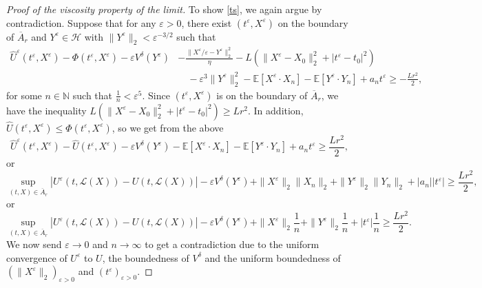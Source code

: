 \documentclass[reqno,11pt]{amsart}
\numberwithin{equation}{section}
\newcommand{\be}{\begin{equation}}
\newcommand{\ee}{\end{equation}}
\newcommand{\e}{\varepsilon}
\newcommand{\nd}{\noindent}
\renewcommand{\hat}{\widehat}
\begin{document}
\begin{proof}[Proof of the viscosity property of the limit]
    \nd
    To show \eqref{ts}, we again argue by contradiction. Suppose that for any $\e>0$, there exist $(t^\e,X^\e)$ on the boundary of $\overline{A}_r$ and $Y^\e\in\mathcal{H}$ with $\|Y^\e\|_2<\e^{-3/2}$ such that
    \be\nonumber
    \begin{split}
\hat{U}^\e(t^\e,X^\e)-\Phi(t^\e,X^\e)-\e V^\delta(Y^\e)&-\frac{\|X^\e/\e-Y^\e\|_2^2}{\eta}-L\left(\|X^\e-X_0\|_2^2+|t^\e-t_0|^2\right)\\
&\quad-\e^3\|Y^\e\|_2^2-\mathbb{E}[X^\e\cdot X_n]-\mathbb{E}[Y^\e\cdot Y_n]+a_nt^\e\ge -\frac{Lr^2}{2},
    \end{split}
    \ee
    for some $n\in \mathbb{N}$ such that $\frac{1}{n}<\e^5$. Since $(t^\e,X^\e)$ is on the boundary of $\overline{A}_r$, we have the inequality $L\left(\|X^\e-X_0\|_2^2+|t^\e-t_0|^2\right)\ge Lr^2$. In addition, $\hat{U}(t^\e,X^\e)\le \Phi(t^\e,X^\e)$, so we get from the above
    $$\hat{U}^\e(t^\e,X^\e)-\hat{U}(t^\e,X^\e)-\e V^\delta(Y^\e)-\mathbb{E}[X^\e\cdot X_n]-\mathbb{E}[Y^\e\cdot Y_n]+a_n t^\e\ge \frac{Lr^2}{2},$$
    or
    $$\sup_{(t,X)\in \overline{A}_r}|U^\e(t,\mathcal{L}(X))-U(t,\mathcal{L}(X))|-\e V^\delta(Y^\e)+\|X^\e\|_2\|X_n\|_2+\|Y^\e\|_2 \|Y_n\|_2+|a_n||t^\e|\ge \frac{Lr^2}{2},$$
    or
    \be\label{ineq101}\nonumber
    \sup_{(t,X)\in \overline{A}_r}|U^\e(t,\mathcal{L}(X))-U(t,\mathcal{L}(X))|-\e V^\delta(Y^\e)+\|X^\e\|_2\frac{1}{n}+\|Y^\e\|_2 \frac{1}{n}+|t^\e|\frac{1}{n}\ge \frac{Lr^2}{2}.
    \ee
    We now send $\e\to 0$ and $n\to \infty$ to get a contradiction due to the uniform convergence of $U^\e$ to $U$, the boundedness of $V^\delta$ and the uniform boundedness of $(\|X^\e\|_2)_{\e>0}$ and $(t^\e)_{\e >0}$.
\end{proof}
\end{document}
